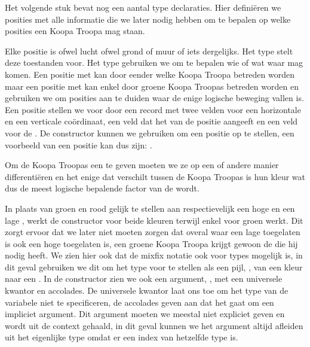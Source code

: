 Het volgende stuk bevat nog een aantal type declaraties. Hier definiëren we
posities met alle informatie die we later nodig hebben om te bepalen op welke
posities een Koopa Troopa mag staan.


Elke positie is ofwel lucht ofwel grond of muur of iets dergelijks. Het type
 stelt deze toestanden voor. Het type 
gebruiken we om te bepalen wie of wat waar mag komen. Een positie met
  kan door eender welke Koopa Troopa betreden
worden maar een positie met   kan enkel door
groene Koopa Troopas betreden worden en gebruiken we om posities aan te duiden
waar de enige logische beweging vallen is. Een positie stellen we voor door een
record met twee velden voor een horizontale en een verticale coördinaat, een
veld dat het  van de positie aangeeft en een veld voor de
. De constructor  kunnen we gebruiken om een
positie op te stellen, een voorbeeld van een positie kan dus zijn: .

Om de Koopa Troopas een  te geven moeten we ze op een of
andere manier differentiëren en het enige dat verschilt tussen de Koopa Troopas
is hun kleur wat dus de meest logische bepalende factor van de
 wordt.


In plaats van groen en rood gelijk te stellen aan respectievelijk een hoge en
een lage , werkt de constructor  voor beide
kleuren terwijl  enkel voor groen werkt. Dit zorgt ervoor dat we
later niet moeten zorgen dat overal waar een lage  toegelaten
is ook een hoge  toegelaten is, een groene Koopa Troopa krijgt
gewoon de  die hij nodig heeft. We zien hier ook dat de mixfix
notatie ook voor types mogelijk is, in dit geval gebruiken we dit om het type
voor te stellen als een pijl, , van een kleur naar een
. In de constructor  zien we ook een argument,
, met een universele kwantor en accolades. De universele kwantor
laat ons toe om het type van de variabele  niet te specificeren, de
accolades geven aan dat het gaat om een impliciet argument. Dit argument moeten
we meestal niet expliciet geven en wordt uit de context gehaald, in dit geval
kunnen we het argument altijd afleiden uit het eigenlijke type omdat er een
index van hetzelfde type is.

